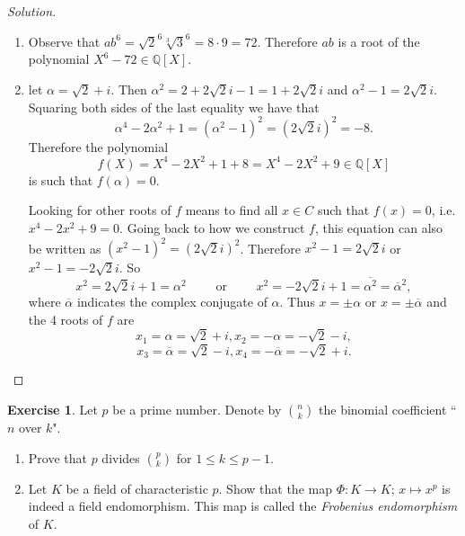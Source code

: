 \documentclass[a4paper,10pt,reqno]{amsart}
\newcommand{\Q}{\mathbb{Q}}
\theoremstyle{definition} %
\newtheorem{ex}{Exercise}[section]
\newenvironment{sol}
  {\renewcommand\qedsymbol{$\blacksquare$}\begin{proof}[Solution]}
  {\end{proof}}
\begin{document}
\begin{sol}~
    \begin{enumerate}[label=(\roman*)]
        \item Observe that $ab^6=\sqrt{2}^6\sqrt[3]{3}^6=8\cdot 9=72$.
        Therefore $ab$ is a root of the polynomial $X^6-72\in\Q[X]$.
        \item let $\alpha=\sqrt{2} + i$. 
        Then $\alpha^2=2+2\sqrt{2}i-1=1+2\sqrt{2}i$ and $\alpha^2-1=2\sqrt{2}i$.
        Squaring both sides of the last equality we have that
        \[
         \alpha^4-2\alpha^2+1=(\alpha^2-1)^2=(2\sqrt{2}i)^2=-8.
        \]
        Therefore the polynomial 
        \[
        f(X)=X^4-2X^2+1+8=X^4-2X^2+9\in \Q[X]
        \]
        is such that $f(\alpha)=0$.

        Looking for other roots of $f$ means to find all $x\in C$
        such that $f(x)=0$, i.e. $x^4-2x^2+9=0$. 
        Going back to how we construct $f$, this equation 
        can also be written as $(x^2-1)^2=(2\sqrt{2}i)^2$.
        Therefore $x^2-1=2\sqrt{2}i$ or $x^2-1=-2\sqrt{2}i$.
        So 
        \[
        x^2=2\sqrt{2}i+1=\alpha^2\qquad\text{ or } \qquad x^2=-2\sqrt{2}i+1=\overline{\alpha^2}=\overline{\alpha}^2,
        \]
        where $\overline{\alpha}$ indicates the complex conjugate of 
        $\alpha$.
        Thus $x=\pm \alpha$ or $x=\pm \overline{\alpha}$ and the 4 roots of $f$ are
        \[
        x_1=\alpha=\sqrt{2} + i, x_2=-\alpha=-\sqrt{2} - i,
        \]
        \[
        x_3=\overline{\alpha}=\sqrt{2} - i, x_4=-\overline{\alpha}=-\sqrt{2} + i.
        \]
    \end{enumerate}
\end{sol}

\begin{ex} Let $p$ be a prime number. Denote by $\binom{n}{k}$ the binomial coefficient ``$n$ over $k$".
    \begin{enumerate}[label=(\roman*)]
    \item Prove that $p$ divides $\binom{p}{k}$ for $1 \leq k \leq p-1$.
    \item Let $K$ be a field of characteristic $p$. Show that the map $\Phi: K \to K$; $x \mapsto x^p$ is indeed a field endomorphism. This map is called the \emph{Frobenius endomorphism} of $K$.
\end{enumerate}
\end{ex}
\end{document}
